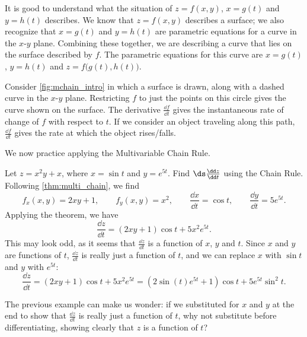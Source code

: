 It is good to understand what the situation of $z=f(x,y)$, $x=g(t)$ and $y=h(t)$ describes. We know that $z=f(x,y)$ describes a surface; we also recognize that $x=g(t)$ and $y=h(t)$ are parametric equations for a curve in the $x$-$y$ plane. Combining these together, we are describing a curve that lies on the surface described by $f$. The parametric equations for this curve are $x=g(t)$, $y=h(t)$ and $z=f\bigl(g(t),h(t)\bigr)$.


Consider \autoref{fig:mchain_intro} in which a surface is drawn, along with a dashed curve in the $x$-$y$ plane. Restricting $f$ to just the points on this circle gives the curve shown on the surface. The derivative $\frac{\dd f}{\dd t}$ gives the instantaneous rate of change of $f$ with respect to $t$. If we consider an object traveling along this path, $\frac{\dd f}{\dd t}$ gives the rate at which the object rises/falls.

We now practice applying the Multivariable Chain Rule.

\begin{example}\label{ex_mchain1}%
Let $z=x^2y+x$, where $x=\sin t$ and $y=e^{5t}$. Find $\ds \frac{\dd z}{\dd t}$ using the Chain Rule.
\solution
Following \autoref{thm:multi_chain}, we find
\[f_x(x,y) = 2xy+1,\qquad f_y(x,y) = x^2,\qquad \frac{\dd x}{\dd t} = \cos t,\qquad \frac{\dd y}{\dd t}= 5e^{5t}.\]
Applying the theorem, we have
\[\frac{\dd z}{\dd t} = (2xy+1)\cos t+ 5x^2e^{5t}.\]
This may look odd, as it seems that $\frac{\dd z}{\dd t}$ is a function of $x$, $y$ and $t$. Since $x$ and $y$ are functions of $t$, $\frac{\dd z}{\dd t}$ is really just a function of $t$, and we can replace $x$ with $\sin t$ and $y$ with $e^{5t}$:
\[\frac{\dd z}{\dd t} = (2xy+1)\cos t+ 5x^2e^{5t} = (2\sin (t)e^{5t}+1)\cos t+5e^{5t}\sin^2t.\]
\end{example}

The previous example can make us wonder: if we substituted for $x$ and $y$ at the end to show that $\frac{\dd z}{\dd t}$ is really just a function of $t$, why not substitute before differentiating, showing clearly that $z$ is a function of $t$?

